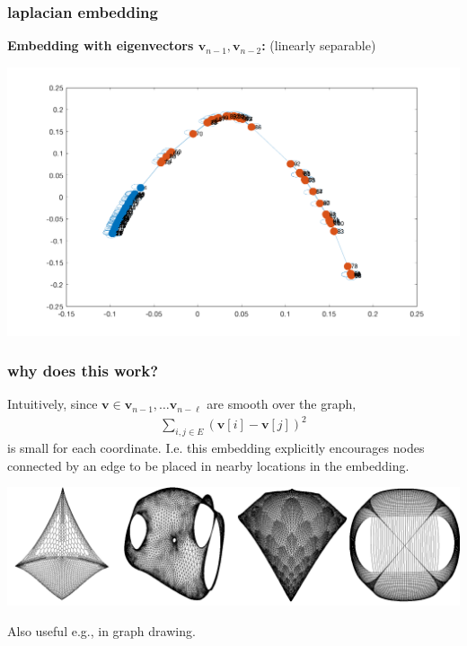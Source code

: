 \documentclass[compress]{beamer}
\newcommand{\bv}[1]{\mathbf{#1}}
\begin{document}
\begin{frame}
	\frametitle{laplacian embedding}
	\begin{center}
	\textbf{Embedding with eigenvectors $\bv{v}_{n-1}, \bv{v}_{n-2}$:} (linearly separable) 
			
			\includegraphics[width=.7\textwidth]{circ3.png}
	\end{center}
\end{frame}

\begin{frame}
	\frametitle{why does this work?}
	Intuitively, since $\bv{v} \in \bv{v}_{n-1}, \ldots \bv{v}_{n-\ell}$ are smooth over the graph, 
	\begin{align*}
		\sum_{i,j \in E} (\bv{v}[i] - \bv{v}[j])^2
	\end{align*}
	is small for each coordinate. I.e. this embedding explicitly encourages nodes connected by an edge to be placed in nearby locations in the embedding.
	\begin{center}
		\includegraphics[width=\textwidth]{graph_drawing.png}
		
		Also useful e.g., in graph drawing.
	\end{center}
	
\end{frame}
\end{document}
